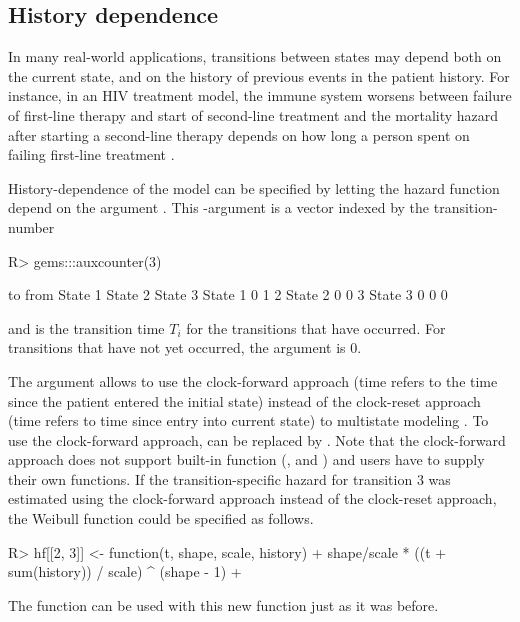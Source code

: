 \subsection{History dependence}\label{subsec:hist}
In many real-world applications, transitions between states may depend both on the current state, and on the history of previous events in the patient history. For instance, in an HIV treatment model, the immune system worsens between failure of first-line therapy and start of second-line treatment and the mortality hazard after starting a second-line therapy depends on how long a person spent on failing first-line treatment \citep{Gazzola2009}.

History-dependence of the model can be specified by letting the hazard function depend on the argument . 
This -argument is a vector indexed by the transition-number
\begin{Schunk}
\begin{Sinput}
R>   gems:::auxcounter(3)
\end{Sinput}
\begin{Soutput}
         to
from      State 1 State 2 State 3
  State 1       0       1       2
  State 2       0       0       3
  State 3       0       0       0
\end{Soutput}
\end{Schunk}
and is the transition time $T_i$ for the transitions that have occurred. For transitions that have not yet occurred, the  argument is $0$. 

The  argument allows to use the clock-forward approach (time refers to the time since the patient entered the initial state)  instead of the clock-reset approach (time refers to time since entry into current state) to multistate modeling \citep{Putter2007}. To use the clock-forward approach,  can be replaced by . 
Note that the clock-forward approach does not support built-in function (,  and ) and users have to supply their own functions. 
If the transition-specific hazard for transition $3$ was estimated using the clock-forward approach instead of the clock-reset approach, the Weibull function could be specified as follows.
\begin{Schunk}
\begin{Sinput}
R>   hf[[2, 3]] <- function(t, shape, scale, history) {
+     shape/scale * ((t + sum(history)) / scale) ^ (shape - 1)  
+   }
\end{Sinput}
\end{Schunk}
The  function can be used with this new function just as it was before. 


